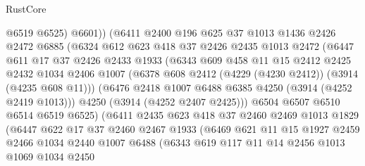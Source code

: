 \begin{lexlean}{RustCore}
\begin{coremodule}
                      @6519
                      @6525)
                    @6601))
                (@6411
                  @2400
                  @196
                  @625
                  @37
                  @1013
                  @1436
                  @2426
                  @2472
                  @6885
                  (@6324
                    @612
                    @623
                    @418
                    @37
                    @2426
                    @2435
                    @1013
                    @2472
                    (@6447
                      @611
                      @17
                      @37
                      @2426
                      @2433
                      @1933
                      (@6343
                        @609
                        @458
                        @11
                        @15
                        @2412
                        @2425
                        @2432
                        @1034
                        @2406
                        @1007
                        (@6378 @608 @2412 (@4229 (@4230 @2412)) (@3914 (@4235 @608 @11)))
                        (@6476 @2418 @1007 @6488 @6385 @4250 (@3914 (@4252 @2419 @1013)))
                        @4250
                        (@3914 (@4252 @2407 @2425)))
                      @6504
                      @6507
                      @6510
                      @6514
                      @6519
                      @6525)
                    (@6411
                      @2435
                      @623
                      @418
                      @37
                      @2460
                      @2469
                      @1013
                      @1829
                      (@6447
                        @622
                        @17
                        @37
                        @2460
                        @2467
                        @1933
                        (@6469
                          @621
                          @11
                          @15
                          @1927
                          @2459
                          @2466
                          @1034
                          @2440
                          @1007
                          @6488
                          (@6343
                            @619
                            @117
                            @11
                            @14
                            @2456
                            @1013
                            @1069
                            @1034
                            @2450

\end{coremodule}
\end{lexlean}
